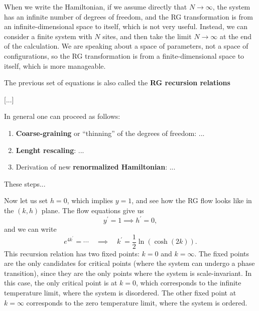 \begin{remark}
    When we write the Hamiltonian, if we assume directly that \(N \to \infty\), the system has an infinite number of degrees of freedom, and the RG transformation is from an infinite-dimensional space to itself, which is not very useful. Instead, we can consider a finite system with \(N\) sites, and then take the limit \(N \to \infty\) at the end of the calculation. We are speaking about a space of parameters, not a space of configurations, so the RG transformation is from a finite-dimensional space to itself, which is more manageable. 
\end{remark}

The previous set of equations is also called the \textbf{RG recursion relations}

[...]

In general one can proceed as follows:
\begin{enumerate}
    \item \textbf{Coarse-graining} or ``thinning'' of the degrees of freedom: ...
    \item \textbf{Lenght rescaling}: ...
    \item Derivation of new \textbf{renormalized Hamiltonian}: ...
\end{enumerate}
These steps...

Now let us set \(h=0\), which implies \(y=1\), and see how the RG flow looks like in the \((k, h)\) plane. The flow equations give us
\[
    y^{\prime} =1 \implies h^{\prime} = 0,
\]
and we can write
\[
    e^{4k^{\prime}} = \cdots \quad \implies \quad k^{\prime} = \frac{1}{2} \ln \left(\cosh(2k)\right).
\]
This recursion relation has two fixed points: \(k = 0\) and \(k = \infty\). The fixed points are the only candidates for critical points (where the system can undergo a phase transition), since they are the only points where the system is scale-invariant. In this case, the only critical point is at \(k = 0\), which corresponds to the infinite temperature limit, where the system is disordered. The other fixed point at \(k = \infty\) corresponds to the zero temperature limit, where the system is ordered.

